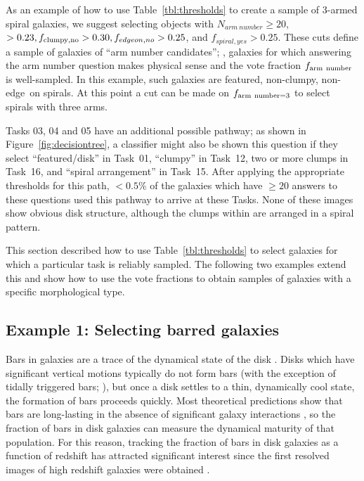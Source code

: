 \documentclass[a4paper,fleqn,usenatbib]{mnras}
\begin{document}
As an example of how to use Table~\ref{tbl:thresholds} to create a sample of
3-armed spiral galaxies, we suggest selecting objects with $N_{arm~number} \ge
20$, \ffeatures$>0.23, f_{\rm clumpy,no} > 0.30, f_{edgeon,no}>0.25$, and
$f_{spiral,yes}>0.25$. These cuts define a sample of galaxies of ``arm number
candidates''; \ie, galaxies for which answering the arm number question makes
physical sense and the vote fraction $f_{\rm arm~number}$ is well-sampled. In
this example, such galaxies are featured, non-clumpy, non-edge~on spirals. At
this point a cut can be made on $f_{\rm arm~number=3}$ to select spirals with
three arms. 

Tasks 03, 04 and 05 have an additional possible pathway; as shown in
Figure~\ref{fig:decisiontree}, a classifier might also be shown this question
if they select ``featured/disk'' in Task~01, ``clumpy'' in Task~12, two or more
clumps in Task~16, and ``spiral arrangement'' in Task~15. After applying
the appropriate thresholds for this path, $< 0.5\%$ of the galaxies which
have $\ge 20$ answers to these questions used this pathway to arrive at
these Tasks. None of these images show obvious disk
structure, although the clumps within are arranged in a spiral pattern. 

This section described how to use Table~\ref{tbl:thresholds} to select
galaxies for which a particular task is reliably sampled. The
following two examples extend this and show how to use the vote fractions to
obtain samples of galaxies with a specific morphological type.

\subsection{Example 1: Selecting barred galaxies} 

Bars in galaxies are a trace of the dynamical state of the disk
\citep[\eg,][]{com09a,ath12}. Disks which have significant vertical motions
typically do not form bars (with the exception of tidally triggered bars;
\citealt{bar91}), but once a disk settles to a thin, dynamically cool state,
the formation of bars proceeds quickly. Most theoretical predictions show that
bars are long-lasting in the absence of significant galaxy interactions
\citep{ath05}, so the fraction of bars in disk galaxies can measure the
dynamical maturity of that population. For this reason, tracking the fraction
of bars in disk galaxies as a function of redshift has attracted significant
interest since the first resolved images of high redshift galaxies were
obtained \citep[\eg,][]{abr99,elm04,jog04,she08a, mel14,sim14}.
\end{document}
